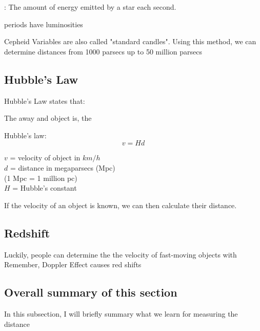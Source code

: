 \begin{greenblock}
    \begin{definition}
         : The amount of energy emitted by a star each second.\\
         \begin{center}
         periods have  luminosities
        \end{center}
    \end{definition}
\end{greenblock}

Cepheid Variables are also called "standard candles". Using this method, we can determine distances from 1000 parsecs up to 50 million parsecs

\subsection{Hubble's Law}
Hubble's Law states that:
\begin{center}
    The  away and object is, the 
\end{center}

\begin{cyanblock}
Hubble's law:
\[
    v = Hd
\]
\begin{center}
    $v$ = velocity of object in $km/h$\\
    $d$ = distance in megaparsecs (Mpc)\\
    (1 Mpc = 1 million pc)\\
    $H$ = Hubble's constant
\end{center}
\end{cyanblock}

If the velocity of an object is known, we can then calculate their distance.

\subsection{Redshift} 
Luckily, people can determine the the velocity of fast-moving objects with \\
Remember, Doppler Effect causes red shifts

\subsection{Overall summary of this section}
In this subsection, I will briefly summary what we learn for measuring the distance\\ 

